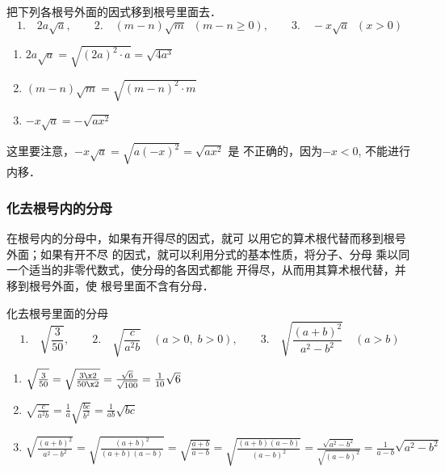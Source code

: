 \begin{example}
    把下列各根号外面的因式移到根号里面去．
\[1.\quad2a\sqrt{a},\qquad 2.\quad(m-n)\sqrt{m}\;\; (m-n\ge 0),\qquad3.\quad -x\sqrt{a}\;\;(x>0) \]
\end{example}

\begin{solution}
\begin{enumerate}
    \item $2a\sqrt{a}=\sqrt{(2a)^2\cdot a}=\sqrt{4a^3}$
    \item $(m-n)\sqrt{m}=\sqrt{(m-n)^2\cdot m}$
    \item $-x\sqrt{a}=-\sqrt{ax^2}$
\end{enumerate}
\end{solution}

这里要注意，$-x\sqrt{a}=\sqrt{a(-x)^2}=\sqrt{ax^2}$
是
不正确的，因为$-x<0$, 不能进行内移．

\subsubsection{化去根号内的分母}
在根号内的分母中，如果有开得尽的因式，就可
以用它的算术根代替而移到根号外面；如果有开不尽
的因式，就可以利用分式的基本性质，将分子、分母
乘以同一个适当的非零代数式，使分母的各因式都能
开得尽，从而用其算术根代替，并移到根号外面，使
根号里面不含有分母．
\begin{example}
    化去根号里面的分母
\[1.\quad\sqrt{\frac{3}{50}},\qquad 2.\quad\sqrt{\frac{c}{a^2b}}\quad (a>0,\; b>0),\qquad 3.\quad\sqrt{\frac{(a+b)^2}{a^2-b^2}}\quad (a>b)\]
\end{example}

\begin{solution}    
\begin{enumerate}
    \item $\sqrt{\frac{3}{50}}=\sqrt{\frac{3\x2}{50\x2}}=\frac{\sqrt{6}}{\sqrt{100}}=\frac{1}{10}\sqrt{6}$
    \item $\sqrt{\frac{c}{a^2b}}=\frac{1}{a}\sqrt{\frac{bc}{b^2}}=\frac{1}{ab}\sqrt{bc}$
    \item $
        \sqrt{\frac{(a+b)^2}{a^2-b^2}} = \sqrt{\frac{(a+b)^2}{(a+b)(a-b)}}
        =\sqrt{\frac{a+b}{a-b}}
        =\sqrt{\frac{(a+b)(a-b)}{(a-b)^2}}
        =\frac{\sqrt{a^2-b^2}}{\sqrt{(a-b)^2}}
        =\frac{1}{a-b}\sqrt{a^2-b^2}$
\end{enumerate}

\end{solution}

